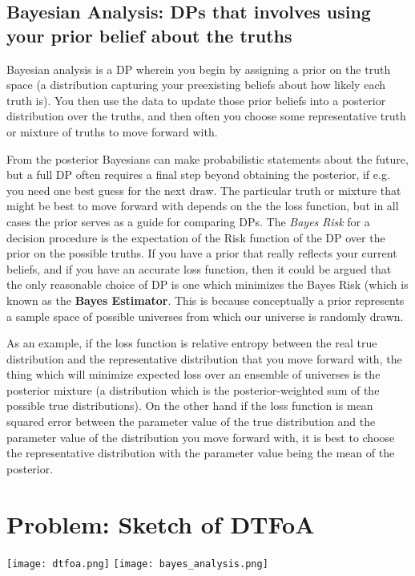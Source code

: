 \subsection{Bayesian Analysis: DPs that involves using your prior belief about the truths}
Bayesian analysis is a DP wherein you begin by assigning a prior on the truth space (a distribution capturing your preexisting beliefs about how likely each truth is). You then use the data to update those prior beliefs into a posterior distribution over the truths, and then often you choose some representative truth or mixture of truths to move forward with.
\n

From the posterior Bayesians can make probabilistic statements about the future, but a full DP often requires a final step beyond obtaining the posterior, if e.g. you need one best guess for the next draw. The particular truth or mixture that might be best to move forward with depends on the the loss function, but in all cases the prior serves as a guide for comparing DPs. The \emph{Bayes Risk} for a decision procedure is the expectation of the Risk function of the DP over the prior on the possible truths. If you have a prior that really reflects your current beliefs, and if you have an accurate loss function, then it could be argued that the only reasonable choice of DP is one which minimizes the Bayes Risk (which is known as the \textbf{Bayes Estimator}. This is because conceptually a prior represents a sample space of possible universes from which our universe is randomly drawn. 
\n

As an example, if the loss function is relative entropy between the real true distribution and the representative distribution that you move forward with, the thing which will minimize expected loss over an ensemble of universes is the posterior mixture (a distribution which is the posterior-weighted sum of the possible true distributions). On the other hand if the loss function is mean squared error between the parameter value of the true distribution and the parameter value of the distribution you move forward with, it is best to choose the representative distribution with the parameter value being the mean of the posterior. 
\n

\section{Problem: Sketch of DTFoA}
\texttt{[image: dtfoa.png]}
\texttt{[image: bayes\_analysis.png]}
